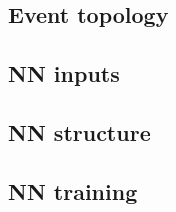 \subsection{Event topology}


\subsection{NN inputs}


\subsection{NN structure}


\subsection{NN training}
